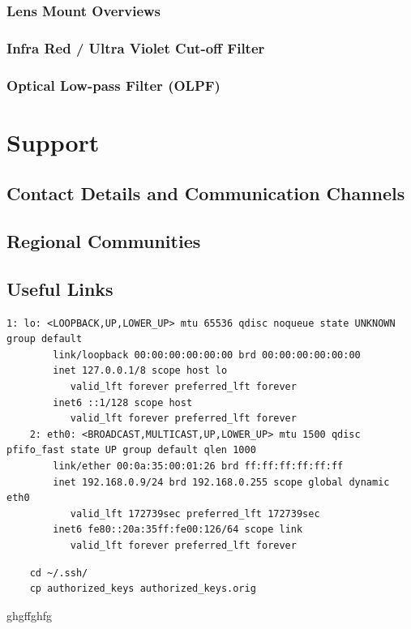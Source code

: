 \documentclass{article}
\begin{document}
\subsubsection{Lens Mount Overviews}
\subsubsection{Infra Red / Ultra Violet Cut-off Filter}
\subsubsection{Optical Low-pass Filter (OLPF)}

\section{Support}
\subsection{Contact Details and Communication Channels}
\subsection{Regional Communities}
\subsection{Useful Links}





\begin{lstlisting}[breaklines=true, breakatwhitespace=true]
    1: lo: <LOOPBACK,UP,LOWER_UP> mtu 65536 qdisc noqueue state UNKNOWN group default 
        link/loopback 00:00:00:00:00:00 brd 00:00:00:00:00:00
        inet 127.0.0.1/8 scope host lo
           valid_lft forever preferred_lft forever
        inet6 ::1/128 scope host 
           valid_lft forever preferred_lft forever
    2: eth0: <BROADCAST,MULTICAST,UP,LOWER_UP> mtu 1500 qdisc pfifo_fast state UP group default qlen 1000
        link/ether 00:0a:35:00:01:26 brd ff:ff:ff:ff:ff:ff
        inet 192.168.0.9/24 brd 192.168.0.255 scope global dynamic eth0
           valid_lft 172739sec preferred_lft 172739sec
        inet6 fe80::20a:35ff:fe00:126/64 scope link 
           valid_lft forever preferred_lft forever
\end{lstlisting}


\begin{lstlisting}
    cd ~/.ssh/
    cp authorized_keys authorized_keys.orig
\end{lstlisting}


ghgffghfg
\end{document}
